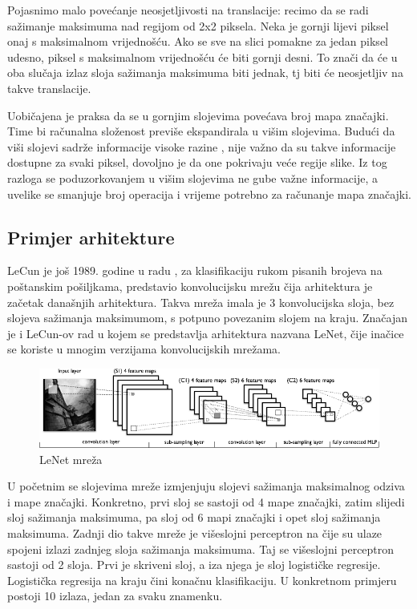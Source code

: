 \documentclass[times, utf8, diplomski, numeric]{fer}
\begin{document}
Pojasnimo malo povećanje neosjetljivosti na translacije: recimo da se radi sažimanje maksimuma nad regijom od 2x2 piksela. Neka je gornji lijevi piksel onaj s maksimalnom vrijednošću. Ako se sve na slici pomakne za jedan piksel udesno, piksel s maksimalnom vrijednošću će biti gornji desni. To znači da će u oba slučaja izlaz sloja sažimanja maksimuma biti jednak, tj biti će neosjetljiv na takve translacije.

Uobičajena je praksa da se u gornjim slojevima povećava broj mapa značajki. Time bi računalna složenost previše ekspandirala u višim slojevima. Budući da viši slojevi sadrže informacije visoke razine , nije važno da su takve informacije dostupne za svaki piksel, dovoljno je da one pokrivaju veće regije slike. Iz tog razloga se poduzorkovanjem u višim slojevima ne gube važne informacije, a uvelike se smanjuje broj operacija i vrijeme potrebno za računanje mapa značajki.

\subsection{Primjer arhitekture}

LeCun je još 1989. godine u radu \cite{lecun-98b}, za klasifikaciju rukom pisanih brojeva na poštanskim pošiljkama, predstavio konvolucijsku mrežu čija arhitektura je začetak današnjih arhitektura. Takva mreža imala je 3 konvolucijska sloja, bez slojeva sažimanja maksimumom, s potpuno povezanim slojem na kraju. Značajan je i LeCun-ov rad \cite{gradient_document} u kojem se predstavlja arhitektura nazvana LeNet, čije inačice se koriste u mnogim verzijama konvolucijskih mrežama.

\begin{figure}[htb]
\centering
\includegraphics[width=\textwidth]{imgs/mylenet.png}
\caption{LeNet mreža}
\label{fig:lenet5}
\end{figure}

U početnim se slojevima mreže izmjenjuju slojevi sažimanja maksimalnog odziva i mape značajki. Konkretno, prvi sloj se sastoji od 4 mape značajki, zatim slijedi sloj sažimanja maksimuma, pa sloj od 6 mapi značajki i opet sloj sažimanja maksimuma. Zadnji dio takve mreže je višeslojni perceptron na čije su ulaze spojeni izlazi zadnjeg sloja sažimanja maksimuma. Taj se višeslojni perceptron sastoji od 2 sloja. Prvi je skriveni sloj, a iza njega je sloj logističke regresije. Logistička regresija na kraju čini konačnu klasifikaciju. U konkretnom primjeru postoji 10 izlaza, jedan za svaku znamenku.
\end{document}
